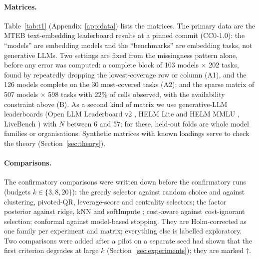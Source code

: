 \paragraph{Matrices.}
Table~\ref{tab:t1} (Appendix~\ref{app:data}) lists the matrices.
The primary data are the MTEB text-embedding leaderboard results \citep{muennighoff2022mteb} at a pinned commit (CC0-1.0): the ``models'' are embedding models and the ``benchmarks'' are embedding tasks, not generative LLMs.
Two settings are fixed from the missingness pattern alone, before any error was computed: a complete block of 103 models $\times$ 202 tasks, found by repeatedly dropping the lowest-coverage row or column (A1), and the 126 models complete on the 30 most-covered tasks (A2); and the sparse matrix of 507 models $\times$ 598 tasks with 22\% of cells observed, with the availability constraint above (B).
As a second kind of matrix we use generative-LLM leaderboards (Open LLM Leaderboard v2 \citep{fourrier2024open}, HELM Lite and HELM MMLU \citep{liang2022helm}, LiveBench \citep{white2024livebench}) with $N$ between 6 and 57; for these, held-out folds are whole model families or organisations.
Synthetic matrices with known loadings serve to check the theory (Section~\ref{sec:theory}).

\paragraph{Comparisons.}
The confirmatory comparisons were written down before the confirmatory runs (budgets $k\in\{3,8,20\}$): the greedy selector against random choice and against clustering, pivoted-QR, leverage-score and centrality selectors; the factor posterior against ridge, kNN and softImpute \citep{mazumder2010spectral}; cost-aware against cost-ignorant selection; conformal against model-based stopping.
They are Holm-corrected \citep{holm1979simple} as one family per experiment and matrix; everything else is labelled exploratory.
Two comparisons were added after a pilot on a separate seed had shown that the first criterion degrades at large $k$ (Section~\ref{sec:experiments}); they are marked $\dagger$.

